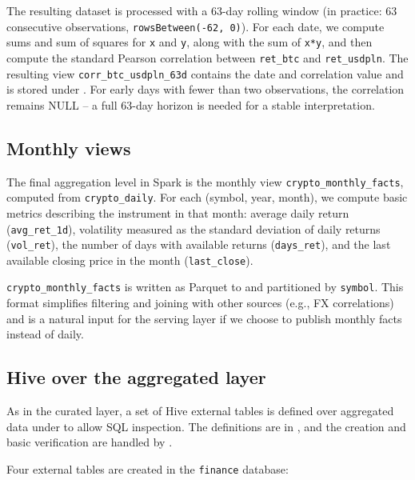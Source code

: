 \documentclass{article}
\begin{document}
The resulting dataset is processed with a 63-day rolling window (in
practice: 63 consecutive observations, \texttt{rowsBetween(-62, 0)}). For
each date, we compute sums and sum of squares for \texttt{x} and
\texttt{y}, along with the sum of \texttt{x*y}, and then compute the
standard Pearson correlation between \texttt{ret\_btc} and
\texttt{ret\_usdpln}. The resulting view \texttt{corr\_btc\_usdpln\_63d}
contains the date and correlation value and is stored under
. For early days
with fewer than two observations, the correlation remains NULL -- a full
63-day horizon is needed for a stable interpretation.

\subsection{Monthly views}

The final aggregation level in Spark is the monthly view
\texttt{crypto\_monthly\_facts}, computed from \texttt{crypto\_daily}. For
each (symbol, year, month), we compute basic metrics describing the
instrument in that month: average daily return (\texttt{avg\_ret\_1d}),
volatility measured as the standard deviation of daily returns
(\texttt{vol\_ret}), the number of days with available returns
(\texttt{days\_ret}), and the last available closing price in the month
(\texttt{last\_close}).

\texttt{crypto\_monthly\_facts} is written as Parquet to
 and
partitioned by \texttt{symbol}. This format simplifies filtering and
joining with other sources (e.g., FX correlations) and is a natural input
for the serving layer if we choose to publish monthly facts instead of
daily.

\subsection{Hive over the aggregated layer}

As in the curated layer, a set of Hive external tables is defined over
aggregated data under  to allow SQL
inspection. The definitions are in , and the
creation and basic verification are handled by .

Four external tables are created in the \texttt{finance} database:
\end{document}
